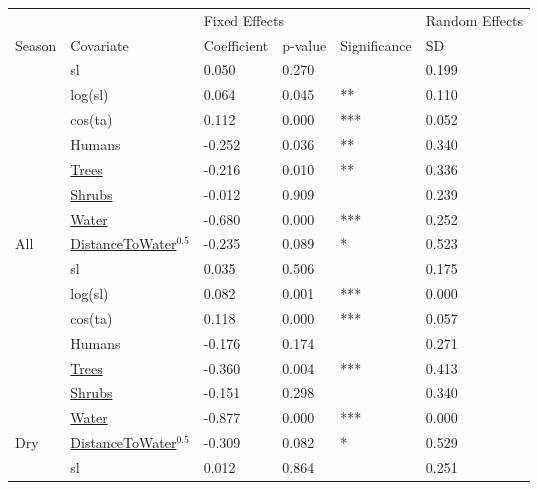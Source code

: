 
\begin{tabular}[t]{llllll}
\toprule
\multicolumn{1}{l}{} & \multicolumn{1}{l}{} & \multicolumn{3}{l}{Fixed Effects} & \multicolumn{1}{l}{Random Effects} \\
\cmidrule(l{3pt}r{3pt}){3-5} \cmidrule(l{3pt}r{3pt}){6-6}
Season & Covariate & Coefficient & p-value & Significance & SD\\
\midrule
 & sl & 0.050 & 0.270 &  & 0.199\\

 & log(sl) & 0.064 & 0.045 & ** & 0.110\\

 & cos(ta) & 0.112 & 0.000 & *** & 0.052\\

 & Humans & -0.252 & 0.036 & ** & 0.340\\

 & \underline{Trees} & -0.216 & 0.010 & ** & 0.336\\

 & \underline{Shrubs} & -0.012 & 0.909 &  & 0.239\\

 & \underline{Water} & -0.680 & 0.000 & *** & 0.252\\

\multirow{-8}{*}{\raggedright\arraybackslash All} & \underline{DistanceToWater}$^{0.5}$ & -0.235 & 0.089 & * & 0.523\\
\cmidrule{1-6}
 & sl & 0.035 & 0.506 &  & 0.175\\

 & log(sl) & 0.082 & 0.001 & *** & 0.000\\

 & cos(ta) & 0.118 & 0.000 & *** & 0.057\\

 & Humans & -0.176 & 0.174 &  & 0.271\\

 & \underline{Trees} & -0.360 & 0.004 & *** & 0.413\\

 & \underline{Shrubs} & -0.151 & 0.298 &  & 0.340\\

 & \underline{Water} & -0.877 & 0.000 & *** & 0.000\\

\multirow{-8}{*}{\raggedright\arraybackslash Dry} & \underline{DistanceToWater}$^{0.5}$ & -0.309 & 0.082 & * & 0.529\\
\cmidrule{1-6}
 & sl & 0.012 & 0.864 &  & 0.251\\


\end{tabular}

